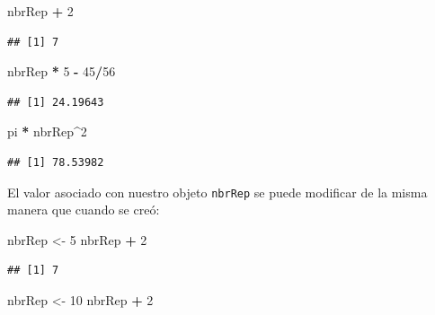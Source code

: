 \documentclass[
]{book}
\newenvironment{Shaded}{\begin{snugshade}}{\end{snugshade}}
\newcommand{\DecValTok}[1]{\textcolor[rgb]{0.00,0.00,0.81}{#1}}
\newcommand{\NormalTok}[1]{#1}
\newcommand{\OperatorTok}[1]{\textcolor[rgb]{0.81,0.36,0.00}{\textbf{#1}}}
\newcommand{\StringTok}[1]{\textcolor[rgb]{0.31,0.60,0.02}{#1}}
\begin{document}
\begin{Shaded}
\begin{Highlighting}[]
\NormalTok{nbrRep }\OperatorTok{+}\StringTok{ }\DecValTok{2}
\end{Highlighting}
\end{Shaded}

\begin{verbatim}
## [1] 7
\end{verbatim}

\begin{Shaded}
\begin{Highlighting}[]
\NormalTok{nbrRep }\OperatorTok{*}\StringTok{ }\DecValTok{5} \OperatorTok{-}\StringTok{ }\DecValTok{45}\OperatorTok{/}\DecValTok{56}
\end{Highlighting}
\end{Shaded}

\begin{verbatim}
## [1] 24.19643
\end{verbatim}

\begin{Shaded}
\begin{Highlighting}[]
\NormalTok{pi }\OperatorTok{*}\StringTok{ }\NormalTok{nbrRep}\OperatorTok{^}\DecValTok{2}
\end{Highlighting}
\end{Shaded}

\begin{verbatim}
## [1] 78.53982
\end{verbatim}

El valor asociado con nuestro objeto \texttt{nbrRep} se puede modificar de la misma manera que cuando se creó:

\begin{Shaded}
\begin{Highlighting}[]
\NormalTok{nbrRep <-}\StringTok{ }\DecValTok{5}
\NormalTok{nbrRep }\OperatorTok{+}\StringTok{ }\DecValTok{2}
\end{Highlighting}
\end{Shaded}

\begin{verbatim}
## [1] 7
\end{verbatim}

\begin{Shaded}
\begin{Highlighting}[]
\NormalTok{nbrRep <-}\StringTok{ }\DecValTok{10}
\NormalTok{nbrRep }\OperatorTok{+}\StringTok{ }\DecValTok{2}
\end{Highlighting}
\end{Shaded}
\end{document}
